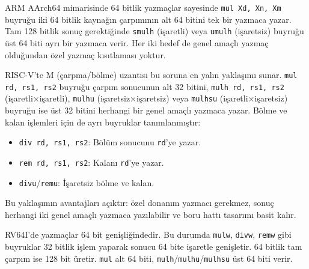ARM AArch64 mimarisinde 64 bitlik yazmaçlar sayesinde \texttt{mul Xd, Xn, Xm} buyruğu iki 64 bitlik kaynağın çarpımının alt 64 bitini tek bir yazmaca yazar. Tam 128 bitlik sonuç gerektiğinde \texttt{smulh} (işaretli) veya \texttt{umulh} (işaretsiz) buyruğu üst 64 biti ayrı bir yazmaca verir. Her iki hedef de genel amaçlı yazmaç olduğundan özel yazmaç kısıtlaması yoktur.

RISC-V'te M (çarpma/bölme) uzantısı bu soruna en yalın yaklaşımı sunar. \texttt{mul rd, rs1, rs2} buyruğu çarpım sonucunun alt 32 bitini, \texttt{mulh rd, rs1, rs2} (işaretli×işaretli), \texttt{mulhu} (işaretsiz×işaretsiz) veya \texttt{mulhsu} (işaretli×işaretsiz) buyruğu ise üst 32 bitini herhangi bir genel amaçlı yazmaca yazar. Bölme ve kalan işlemleri için de ayrı buyruklar tanımlanmıştır:

\begin{itemize}[nosep]
\item \texttt{div rd, rs1, rs2}: Bölüm sonucunu \texttt{rd}'ye yazar.
\item \texttt{rem rd, rs1, rs2}: Kalanı \texttt{rd}'ye yazar.
\item \texttt{divu}/\texttt{remu}: İşaretsiz bölme ve kalan.
\end{itemize}

Bu yaklaşımın avantajları açıktır: özel donanım yazmacı gerekmez, sonuç herhangi iki genel amaçlı yazmaca yazılabilir ve boru hattı tasarımı basit kalır.

\begin{bilginot}
RV64I'de yazmaçlar 64 bit genişliğindedir. Bu durumda \texttt{mulw}, \texttt{divw}, \texttt{remw} gibi buyruklar 32 bitlik işlem yaparak sonucu 64 bite işaretle genişletir. 64 bitlik tam çarpım ise 128 bit üretir. \texttt{mul} alt 64 biti, \texttt{mulh}/\texttt{mulhu}/\texttt{mulhsu} üst 64 biti verir.
\end{bilginot}

